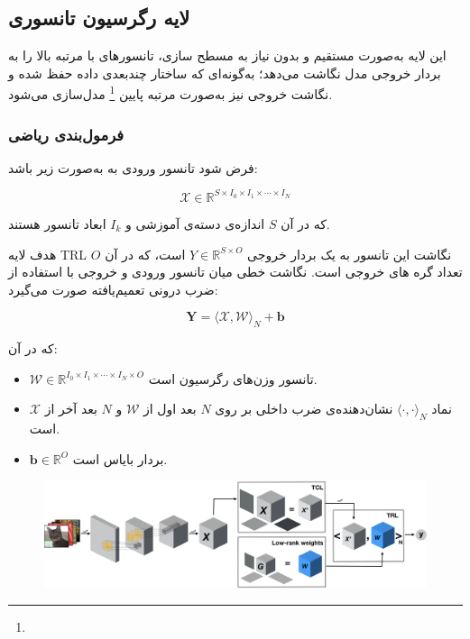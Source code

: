 \subsection{لایه رگرسیون تانسوری}

این لایه به‌صورت مستقیم و بدون نیاز به مسطح سازی، تانسورهای با مرتبه بالا را به بردار خروجی مدل نگاشت می‌دهد؛ به‌گونه‌ای که ساختار چندبعدی داده حفظ شده و نگاشت خروجی نیز به‌صورت مرتبه پایین \footnote{} مدل‌سازی می‌شود.

\subsubsection*{فرمول‌بندی ریاضی}

فرض شود تانسور ورودی به  به‌صورت زیر باشد:

\[
\mathcal{X} \in \mathbb{R}^{S \times I_0 \times I_1 \times \cdots \times I_N}
\]

که در آن $S$ اندازه‌ی دسته‌ی آموزشی و $I_k$ ابعاد تانسور هستند.

هدف لایه TRL نگاشت این تانسور به یک بردار خروجی $Y \in \mathbb{R}^{S \times O}$ است، که در آن $O$ تعداد گره های  خروجی است. نگاشت خطی میان تانسور ورودی و خروجی با استفاده از ضرب درونی تعمیم‌یافته صورت می‌گیرد:

\[
\mathbf{Y} = \langle \mathcal{X}, \mathcal{W} \rangle_N + \mathbf{b}
\]

که در آن:

\begin{itemize}
	\item $\mathcal{W} \in \mathbb{R}^{I_0 \times I_1 \times \cdots \times I_N \times O}$ تانسور وزن‌های رگرسیون است.
	\item نماد $\langle \cdot, \cdot \rangle_N$ نشان‌دهنده‌ی ضرب داخلی بر روی $N$ بعد اول از $\mathcal{W}$ و $N$ بعد آخر از $\mathcal{X}$ است.
	\item $\mathbf{b} \in \mathbb{R}^{O}$ بردار بایاس است.
\end{itemize}



\begin{figure}[h]
	\centering
	\begin{minipage}[b]{0.7\textwidth}
		\centering
		\includegraphics[width=\textwidth]{transformer_images/trl.png}
		\caption{}
		\label{fig:tensor_regression_network}
	\end{minipage}
	\hfill
\end{figure}





